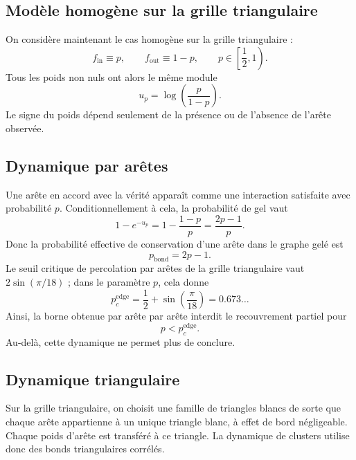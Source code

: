 \subsection{Modèle homogène sur la grille triangulaire}

On considère maintenant le cas homogène sur la grille triangulaire :
\[
    f_{\mathrm{in}}\equiv p,
    \qquad
    f_{\mathrm{out}}\equiv 1-p,
    \qquad
    p\in\left[\frac12,1\right).
\]
Tous les poids non nuls ont alors le même module
\begin{equation}
    u_p=\log\left(\frac{p}{1-p}\right).
    \label{eq:chapII_up}
\end{equation}
Le signe du poids dépend seulement de la présence ou de l'absence de l'arête observée.

\subsection{Dynamique par arêtes}

Une arête en accord avec la vérité apparaît comme une interaction satisfaite avec probabilité $p$. Conditionnellement à cela, la probabilité de gel vaut
\[
    1-e^{-u_p}=1-\frac{1-p}{p}=\frac{2p-1}{p}.
\]
Donc la probabilité effective de conservation d'une arête dans le graphe gelé est
\begin{equation}
    p_{\mathrm{bond}}=2p-1.
    \label{eq:chapII_pbond_edges}
\end{equation}
Le seuil critique de percolation par arêtes de la grille triangulaire vaut $2\sin(\pi/18)$ ; dans le paramètre $p$, cela donne
\begin{equation}
    p_c^{\mathrm{edge}}
    =
    \frac12+\sin\left(\frac\pi{18}\right)
    =0.673\ldots
    \label{eq:chapII_pc_edges}
\end{equation}
Ainsi, la borne obtenue par \SW{} arête par arête interdit le recouvrement partiel pour
\[
    p<p_c^{\mathrm{edge}}.
\]
Au-delà, cette dynamique ne permet plus de conclure.

\subsection{Dynamique triangulaire}

Sur la grille triangulaire, on choisit une famille de triangles blancs de sorte que chaque arête appartienne à un unique triangle blanc, à effet de bord négligeable. Chaque poids d'arête est transféré à ce triangle. La dynamique de clusters utilise donc des bonds triangulaires corrélés.

